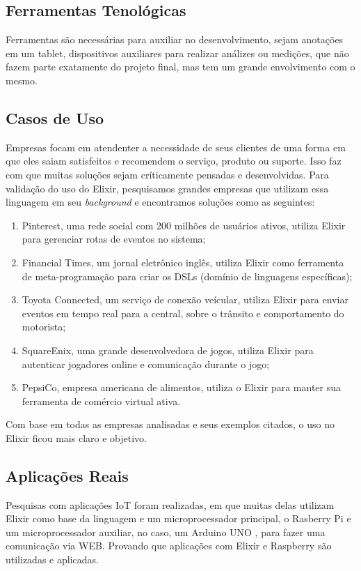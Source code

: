 \documentclass[../../layout.tex]{subfiles}
\begin{document}
\subsection{Ferramentas Tenológicas}
\hspace*{3em}Ferramentas são necessárias para auxiliar no desenvolvimento, sejam anotações em um tablet, dispositivos auxiliares para realizar análizes ou medições, que não fazem parte exatamente do projeto final, mas tem um grande envolvimento com o mesmo.
\subsection{Casos de Uso}
\hspace*{3em}Empresas focam em atendenter a necessidade de seus clientes de uma forma em que eles saiam satisfeitos e recomendem o serviço, produto ou suporte. Isso faz com que muitas soluções sejam críticamente pensadas e desenvolvidas. Para validação do uso do Elixir, pesquisamos grandes empresas que utilizam essa linguagem em seu \emph{background}  e encontramos soluções como as seguintes:
\begin{enumerate}[label=\alph*)]
\itemsep0em
    \item Pinterest, uma rede social com 200 milhões de usuários ativos, utiliza Elixir para gerenciar rotas de eventos no sistema;
    \item Financial Times, um jornal eletrônico inglês, utiliza Elixir como ferramenta de meta-programação para criar os DSLs (domínio de linguagens específicas);
    \item Toyota Connected, um serviço de conexão veícular, utiliza Elixir para enviar eventos em tempo real para a central, sobre o trânsito e comportamento do motorista;
    \item SquareEnix, uma grande desenvolvedora de jogos, utiliza Elixir para autenticar jogadores online e comunicação durante o  jogo;
    \item PepsiCo, empresa americana de alimentos, utiliza o Elixir para manter sua ferramenta de comércio virtual ativa.
\end{enumerate}

Com base em todas as empresas analisadas e seus exemplos citados, o uso no Elixir ficou mais claro e objetivo. \par

\subsection{Aplicações Reais}
\hspace*{3em}Pesquisas com aplicações IoT foram realizadas, em que muitas delas utilizam Elixir como base da linguagem e um microprocessador principal, o Rasberry Pi e um microprocessador auxiliar, no caso, um Arduino UNO , para fazer uma comunicação via WEB. Provando que aplicações com Elixir e Raspberry são utilizadas e aplicadas.
\end{document}
